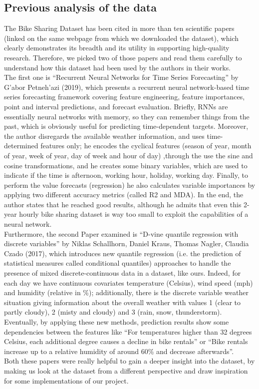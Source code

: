 \documentclass[11pt,a4paper]{article}
\begin{document}
\subsection{Previous analysis of the data}

The Bike Sharing Dataset has been cited in more than ten scientific papers (linked on the same webpage from which we downloaded the dataset), which clearly demonstrates its breadth and its utility in supporting high-quality research. Therefore, we picked two of those papers and read them carefully to understand how this dataset had been used by the authors in their works. \\
The first one is “Recurrent Neural Networks for Time Series Forecasting” by G'abor Petneh'azi (2019), which presents a recurrent neural network-based time series forecasting framework covering feature engineering, feature importances, point and interval predictions, and forecast evaluation. Briefly, RNNs are essentially neural networks with memory, so they can remember things from the past, which is obviously useful for predicting time-dependent targets. Moreover, the author disregards the available weather information, and uses time-determined features only; he encodes the cyclical features (season of year, month of year, week of year, day of week and hour of day) ,through the use the sine and cosine transformations, and he creates some binary variables, which are used to indicate if the time is afternoon, working hour, holiday, working day. Finally, to perform the value forecasts (regression) he also calculates variable importances by applying two different accuracy metrics (called R2 and MDA). In the end, the author states that he reached good results, although he admits that even this 2-year hourly bike sharing dataset is way too small to exploit the capabilities of a neural network. \\
Furthermore, the second Paper examined is “D-vine quantile regression with discrete variables” by Niklas Schallhorn, Daniel Kraus, Thomas Nagler, Claudia Czado (2017), which introduces new quantile regression (i.e. the prediction of statistical measures called conditional quantiles) approaches to handle the presence of mixed discrete-continuous data in a dataset, like ours. Indeed, for each day we have continuous covariates temperature (Celsius), wind speed (mph) and humidity (relative in \%); additionally, there is the discrete variable weather situation giving information about the overall weather with values 1 (clear to partly cloudy), 2 (misty and cloudy) and 3 (rain, snow, thunderstorm). Eventually, by applying these new methods, prediction results show some dependencies between the features like “For temperatures higher than 32 degrees Celsius, each additional degree causes a decline in bike rentals” or “Bike rentals increase up to a relative humidity of around 60\% and decrease afterwards”. \\ 
Both these papers were really helpful to gain a deeper insight into the dataset, by making us look at the dataset from a different perspective and draw inspiration for some implementations of our project.
\end{document}
